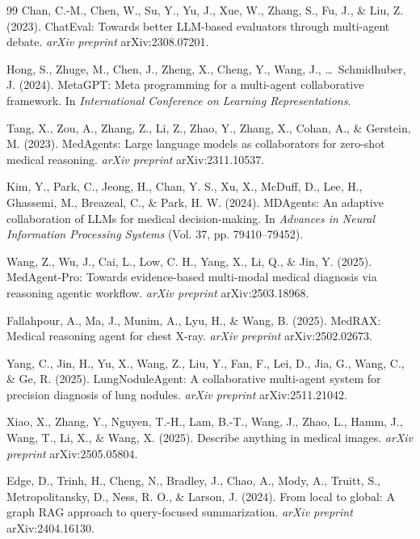 \documentclass[12pt]{article}
\begin{document}
\begin{thebibliography}{99}
Chan, C.-M., Chen, W., Su, Y., Yu, J., Xue, W., Zhang, S., Fu, J., \& Liu, Z. (2023). ChatEval: Towards better LLM-based evaluators through multi-agent debate. \textit{arXiv preprint} arXiv:2308.07201.

Hong, S., Zhuge, M., Chen, J., Zheng, X., Cheng, Y., Wang, J., \ldots\ Schmidhuber, J. (2024). MetaGPT: Meta programming for a multi-agent collaborative framework. In \textit{International Conference on Learning Representations}.

Tang, X., Zou, A., Zhang, Z., Li, Z., Zhao, Y., Zhang, X., Cohan, A., \& Gerstein, M. (2023). MedAgents: Large language models as collaborators for zero-shot medical reasoning. \textit{arXiv preprint} arXiv:2311.10537.

Kim, Y., Park, C., Jeong, H., Chan, Y. S., Xu, X., McDuff, D., Lee, H., Ghassemi, M., Breazeal, C., \& Park, H. W. (2024). MDAgents: An adaptive collaboration of LLMs for medical decision-making. In \textit{Advances in Neural Information Processing Systems} (Vol. 37, pp. 79410--79452).

Wang, Z., Wu, J., Cai, L., Low, C. H., Yang, X., Li, Q., \& Jin, Y. (2025). MedAgent-Pro: Towards evidence-based multi-modal medical diagnosis via reasoning agentic workflow. \textit{arXiv preprint} arXiv:2503.18968.

Fallahpour, A., Ma, J., Munim, A., Lyu, H., \& Wang, B. (2025). MedRAX: Medical reasoning agent for chest X-ray. \textit{arXiv preprint} arXiv:2502.02673.

Yang, C., Jin, H., Yu, X., Wang, Z., Liu, Y., Fan, F., Lei, D., Jia, G., Wang, C., \& Ge, R. (2025). LungNoduleAgent: A collaborative multi-agent system for precision diagnosis of lung nodules. \textit{arXiv preprint} arXiv:2511.21042.

Xiao, X., Zhang, Y., Nguyen, T.-H., Lam, B.-T., Wang, J., Zhao, L., Hamm, J., Wang, T., Li, X., \& Wang, X. (2025). Describe anything in medical images. \textit{arXiv preprint} arXiv:2505.05804.

Edge, D., Trinh, H., Cheng, N., Bradley, J., Chao, A., Mody, A., Truitt, S., Metropolitansky, D., Ness, R. O., \& Larson, J. (2024). From local to global: A graph RAG approach to query-focused summarization. \textit{arXiv preprint} arXiv:2404.16130.


\end{thebibliography}
\end{document}
